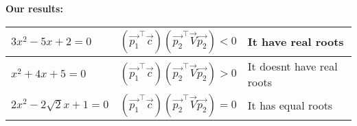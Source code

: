 \documentclass[journal,12pt,twocolumn]{IEEEtran}
\begin{document}
\textbf{Our results:}
\begin{center}
\begin{tabular}{ | m{5em} | m{10em}| m{5em} | } 
\hline
 $3x^2-5x+2=0$& $(\vec{p_1}^{\top}\vec{c}) (\vec{p_2}^{\top}\vec{V}\vec{p_2})<0$ & It have real roots \\ 
  \hline
  $x^2+4x+5=0$ & $(\vec{p_1}^{\top}\vec{c}) (\vec{p_2}^{\top}\vec{V}\vec{p_2})>0$ & It doesnt have real roots \\ 
  \hline
 $2x^2-2\sqrt{2}x+1=0$ & $(\vec{p_1}^{\top}\vec{c}) (\vec{p_2}^{\top}\vec{V}\vec{p_2})=0$ & It has equal roots\\ 
  \hline
\end{tabular}
\end{center}
\end{document}
